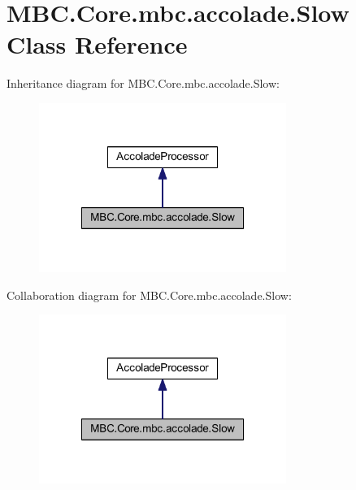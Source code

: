 \hypertarget{class_m_b_c_1_1_core_1_1mbc_1_1accolade_1_1_slow}{\section{M\-B\-C.\-Core.\-mbc.\-accolade.\-Slow Class Reference}
\label{class_m_b_c_1_1_core_1_1mbc_1_1accolade_1_1_slow}
}


Inheritance diagram for M\-B\-C.\-Core.\-mbc.\-accolade.\-Slow\-:
\nopagebreak
\begin{figure}[H]
\begin{center}
\leavevmode
\includegraphics[width=228pt]{class_m_b_c_1_1_core_1_1mbc_1_1accolade_1_1_slow__inherit__graph}
\end{center}
\end{figure}


Collaboration diagram for M\-B\-C.\-Core.\-mbc.\-accolade.\-Slow\-:
\nopagebreak
\begin{figure}[H]
\begin{center}
\leavevmode
\includegraphics[width=228pt]{class_m_b_c_1_1_core_1_1mbc_1_1accolade_1_1_slow__coll__graph}
\end{center}
\end{figure}
